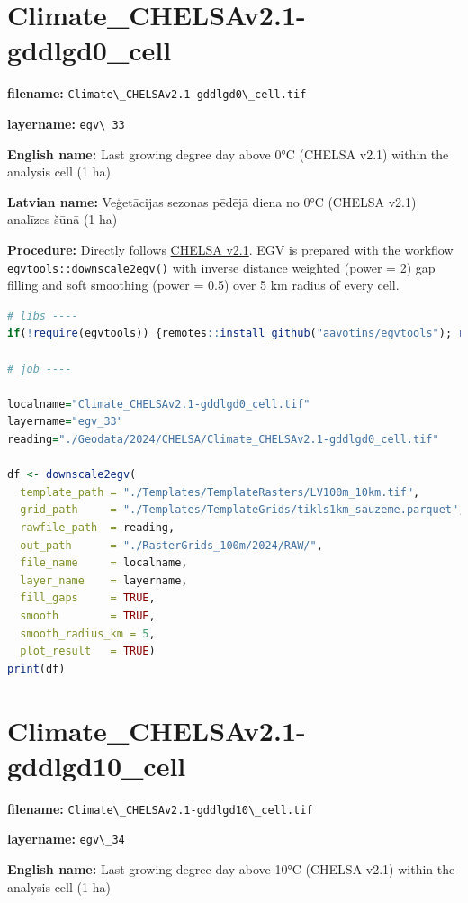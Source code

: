 \documentclass[
]{book}
\newcommand{\passthrough}[1]{#1}
\begin{document}
\section{Climate\_CHELSAv2.1-gddlgd0\_cell}\label{ch06.033}

\textbf{filename:} \passthrough{\lstinline!Climate\_CHELSAv2.1-gddlgd0\_cell.tif!}

\textbf{layername:} \passthrough{\lstinline!egv\_33!}

\textbf{English name:} Last growing degree day above 0°C (CHELSA v2.1) within the analysis cell (1 ha)

\textbf{Latvian name:} Veģetācijas sezonas pēdējā diena no 0°C (CHELSA v2.1) analīzes šūnā (1 ha)

\textbf{Procedure:} Directly follows \hyperref[Ch04.11]{CHELSA v2.1}. EGV is prepared with the
workflow \passthrough{\lstinline!egvtools::downscale2egv()!} with inverse distance weighted (power = 2)
gap filling and soft smoothing (power = 0.5) over 5 km radius of every cell.

\begin{lstlisting}[language=R]
# libs ----
if(!require(egvtools)) {remotes::install_github("aavotins/egvtools"); require(egvtools)}

# job ----

localname="Climate_CHELSAv2.1-gddlgd0_cell.tif"
layername="egv_33"
reading="./Geodata/2024/CHELSA/Climate_CHELSAv2.1-gddlgd0_cell.tif"

df <- downscale2egv(
  template_path = "./Templates/TemplateRasters/LV100m_10km.tif",
  grid_path     = "./Templates/TemplateGrids/tikls1km_sauzeme.parquet",
  rawfile_path  = reading,
  out_path      = "./RasterGrids_100m/2024/RAW/",
  file_name     = localname,
  layer_name    = layername,
  fill_gaps     = TRUE,
  smooth        = TRUE,
  smooth_radius_km = 5,
  plot_result   = TRUE)
print(df)
\end{lstlisting}

\section{Climate\_CHELSAv2.1-gddlgd10\_cell}\label{ch06.034}

\textbf{filename:} \passthrough{\lstinline!Climate\_CHELSAv2.1-gddlgd10\_cell.tif!}

\textbf{layername:} \passthrough{\lstinline!egv\_34!}

\textbf{English name:} Last growing degree day above 10°C (CHELSA v2.1) within the analysis cell (1 ha)
\end{document}
